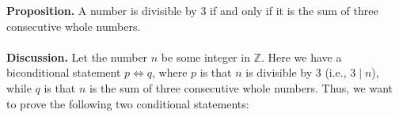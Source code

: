 \documentclass[12pt]{exam}
\begin{document}
\begin{questions}


\question
{}

\question
\textbf{Proposition.} A number is divisible by 3 if and only if it is the sum of three consecutive whole numbers.
\\
\\\textbf{Discussion.} Let the number $n$ be some integer in $\mathbb Z$. Here we have a biconditional statement $p \Leftrightarrow q$, where $p$ is that $n$ is divisible by 3 (i.e., $3 \mid n$), while $q$ is that $n$ is the sum of three consecutive whole numbers. Thus, we want to prove the following two conditional statements:


\end{questions}
\end{document}
